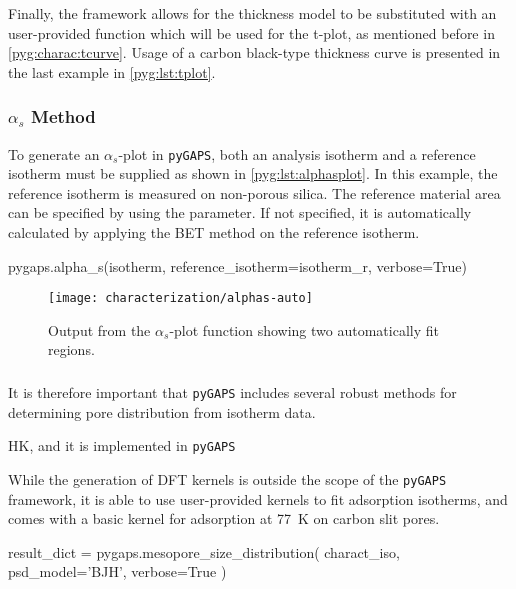 Finally, the framework allows for the thickness model to be substituted
with an user-provided function which will be used for the t-plot, 
as mentioned before in \autoref{pyg:charac:tcurve}.
Usage of a carbon black-type thickness curve is presented in the last
example in \autoref{pyg:lst:tplot}.

\subsubsection{\(\alpha_s\) Method}

To generate an \(\alpha_s\)-plot in \texttt{pyGAPS}, both 
an analysis isotherm and a reference isotherm must be supplied 
as shown in \autoref{pyg:lst:alphasplot}.
In this example, the reference isotherm is measured on non-porous silica.
The reference material area can be specified by using 
the  parameter. If not specified, it 
is automatically calculated by applying the BET
method on the reference isotherm.

\begin{python}[caption={Generating an \(\alpha_s\)-plot},label={pyg:lst:alphasplot}]
pygaps.alpha_s(isotherm, 
			   reference_isotherm=isotherm_r,
			   verbose=True)
\end{python}

\begin{figure}[!htb]
	\centering

	\texttt{[image: characterization/alphas-auto]}
	\caption{Output from the \(\alpha_s\)-plot function showing two
		automatically fit regions.}%
	\label{pyg:fgr:alphasplot}

\end{figure}


\subsubsection{ }
It is
therefore important that \texttt{pyGAPS} includes several robust methods
for determining pore distribution from isotherm data.

HK, and it is implemented in \texttt{pyGAPS}

While the generation of DFT kernels is
outside the scope of the \texttt{pyGAPS} framework, it is able to use
user-provided kernels to fit adsorption isotherms, and comes with
a basic kernel for  adsorption at \SI{77}{\kelvin} on
carbon slit pores.

\begin{python}[caption={PSD using the BJH method},%
    label={pyg:lst:bjh}]
result_dict = pygaps.mesopore_size_distribution(
    charact_iso,
    psd_model='BJH',
    verbose=True
)
\end{python}

